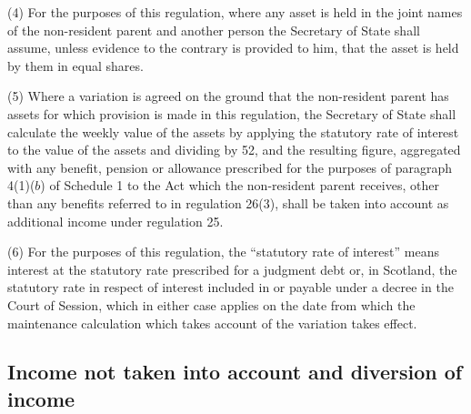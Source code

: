 \documentclass[12pt,a4paper]{article}
\begin{document}
(4) For the purposes of this regulation, where any asset is held in the joint names of the non-resident parent and another person the Secretary of State shall assume, unless evidence to the contrary is provided to him, that the asset is held by them in equal shares.

(5) Where a variation is agreed on the ground that the non-resident parent has assets for which provision is made in this regulation, the Secretary of State shall calculate the weekly value of the assets by applying the statutory rate of interest to the value of the assets and dividing by 52, and the resulting figure, aggregated with any benefit, pension or allowance 
prescribed for the purposes of paragraph 4(1)($b$)  of Schedule 1 to the Act  %
which the non-resident parent receives, other than any benefits referred to in regulation 26(3), shall be taken into account as additional income under regulation 25.

(6) For the purposes of this regulation, the “statutory rate of interest” means interest at the statutory rate prescribed for a judgment debt or, in Scotland, the statutory rate in respect of interest included in or payable under a decree in the Court of Session, which in either case applies on the date from which the maintenance calculation which takes account of the variation takes effect.


\subsection[19. Income not taken into account and diversion of income]{Income not taken into account and diversion of income}
\end{document}
